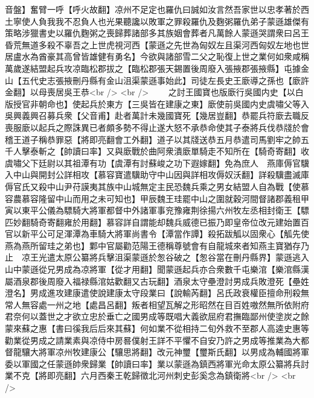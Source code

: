 音盤】奮臂一呼【呼火故翻】凉州不足定也羅仇曰誠如汝言然吾家世以忠孝著於西土寧使人負我我不忍負人也光果聽讒以敗軍之罪殺羅仇及麴粥羅仇弟子蒙遜雄傑有策略涉獵書史以羅仇麴粥之喪歸葬諸部多其族姻會葬者凡萬餘人蒙遜哭謂衆曰呂王昏荒無道多殺不辜吾之上世虎視河西【蒙遜之先世為匈奴左且渠河西匈奴左地也世居盧水為酋豪其高曾皆雄健有勇名】今欲與諸部雪二父之恥復上世之業何如衆咸稱萬歲遂結盟起兵攻凉臨松郡拔之【臨松郡張天錫置後周廢入張掖郡張掖縣】屯據金山【五代史志張掖刪丹縣有金山沮渠蒙遜事始此】司徒左長史王廞導之孫也【廞許金翻】以母喪居吳王恭<br />
<br />
　　之討王國寶也版廞行吳國内史【以白版授官非朝命也】使起兵於東方【三吳皆在建康之東】廞使前吳國内史虞嘯父等入吳興義興召募兵衆【父音甫】赴者萬計未幾國寶死【幾居豈翻】恭罷兵符廞去職反喪服廞以起兵之際誅異已者頗多勢不得止遂大怒不承恭命使其子泰將兵伐恭牋於會稽王道子稱恭罪惡【將即亮翻會工外翻】道子以其牋送恭五月恭遣司馬劉牢之帥五千人擊泰斬之【帥讀曰率】又與廞戰於曲阿衆潰廞單騎走不知所在【騎奇寄翻】收虞嘯父下廷尉以其祖潭有功【虞潭有討蘇峻之功下遐嫁翻】免為庶人　燕庫傉官驥入中山與開封公詳相攻【慕容寶遣驥助守中山因與詳相攻傉奴沃翻】詳殺驥盡滅庫傉官氏又殺中山尹苻謨夷其族中山城無定主民恐魏兵乘之男女結盟人自為戰【使慕容農慕容隆留中山而用之未可知也】甲辰魏王珪罷中山之圍就穀河間督諸郡義租甲寅以東平公儀為驃騎大將軍都督中外諸軍事兖豫雍荆徐揚六州牧左丞相封衛王【驃匹妙翻騎奇寄翻雍於用翻】慕容詳自謂能却魏兵威德已振乃即皇帝位改元建始置百官以新平公可足渾潭為車騎大將軍尚書令【潭當作譚】殺拓跋觚以固衆心【觚先使燕為燕所留珪之弟也】鄴中官屬勸范陽王德稱尊號會有自龍城來者知燕主寶猶存乃止　凉王光遣太原公纂將兵擊沮渠蒙遜於怱谷破之【怱谷當在刪丹縣界】蒙遜逃入山中蒙遜從兄男成為凉將軍【從才用翻】聞蒙遜起兵亦合衆數千屯樂涫【樂涫縣漢屬酒泉郡後周廢入福禄縣涫姑歡翻又古玩翻】酒泉太守壘澄討男成兵敗澄死【壘姓澄名】男成進攻建康遣使說建康太守段業曰【說輸芮翻】呂氏政衰權臣擅命刑殺無常人無容處一州之地【處昌呂翻】叛者相望瓦解之形昭然在目百姓嗷然無所依附府君奈何以蓋世之才欲立忠於垂亡之國男成等既唱大義欲屈府君撫臨鄙州使塗炭之餘蒙來蘇之惠【書曰徯我后后來其蘇】何如業不從相持二旬外救不至郡人高逵史惠等勸業從男成之請業素與凉侍中房晷僕射王詳不平懼不自安乃許之男成等推業為大都督龍驤大將軍凉州牧建康公【驤思將翻】改元神璽【璽斯氏翻】以男成為輔國將軍委以軍國之任蒙遜帥衆歸業【帥讀曰率】業以蒙遜為鎮西將軍光命太原公纂將兵討業不克【將即亮翻】六月西秦王乾歸徵北河州刺史彭奚念為鎮衛將<br />
<br />
